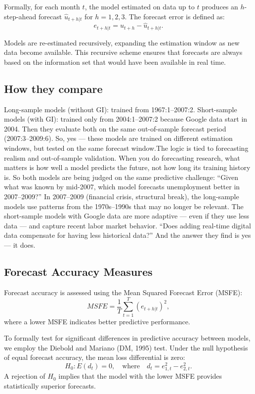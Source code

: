 \documentclass{article}
\begin{document}
Formally, for each month $t$, the model estimated on data up to $t$ produces an $h$-step-ahead forecast $\hat{u}_{t+h|t}$ for $h = 1, 2, 3$. 
The forecast error is defined as:
\begin{equation}
e_{t+h|t} = u_{t+h} - \hat{u}_{t+h|t}.
\end{equation}

Models are re-estimated recursively, expanding the estimation window as new data become available. 
This recursive scheme ensures that forecasts are always based on the information set that would have been available in real time.

\subsection{How they compare}
Long-sample models (without GI): trained from 1967:1–2007:2. Short-sample models (with GI): trained only from 2004:1–2007:2 because Google data start in 2004. Then they evaluate both on the same out-of-sample forecast period (2007:3–2009:6). So, yes — these models are trained on different estimation windows, but tested on the same forecast window.The logic is tied to forecasting realism and out-of-sample validation. When you do forecasting research, what matters is how well a model predicts the future, not how long its training history is. So both models are being judged on the same predictive challenge: “Given what was known by mid-2007, which model forecasts unemployment better in 2007–2009?” In 2007–2009 (financial crisis, structural break), the long-sample models use patterns from the 1970s–1990s that may no longer be relevant. The short-sample models with Google data are more adaptive — even if they use less data — and capture recent labor market behavior. “Does adding real-time digital data compensate for having less historical data?” And the answer they find is yes — it does.


\subsection{Forecast Accuracy Measures}

Forecast accuracy is assessed using the Mean Squared Forecast Error (MSFE):
\begin{equation}
MSFE = \frac{1}{T} \sum_{t=1}^{T} (e_{t+h|t})^2,
\end{equation}
where a lower MSFE indicates better predictive performance.

To formally test for significant differences in predictive accuracy between models, we employ the Diebold and Mariano (DM, 1995) test. 
Under the null hypothesis of equal forecast accuracy, the mean loss differential is zero:
\begin{equation}
H_0: E(d_t) = 0, \quad \text{where} \quad d_t = e_{1,t}^2 - e_{2,t}^2.
\end{equation}
A rejection of $H_0$ implies that the model with the lower MSFE provides statistically superior forecasts. 
\end{document}
